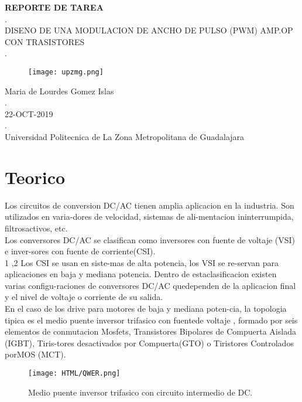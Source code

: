 \documentclass[11pt,a4paper]{article}
\author{Maria de Lourdes Gomez}
\begin{document}
\begin{center}
\textbf{REPORTE DE TAREA}\\
.\\
DISENO DE UNA MODULACION DE ANCHO DE PULSO (PWM) AMP.OP CON TRASISTORES\\
.
\end{center}

\begin{figure}[h]
\centering
\texttt{[image: upzmg.png]} 
\end{figure}

\begin{center}
Maria de Lourdes Gomez Islas\\
.\\
22-OCT-2019\\
.\\
Universidad Politecnica de La Zona Metropolitana de Guadalajara
\end{center}

\newpage 

\part{Teorico}

Los circuitos de conversion DC/AC tienen amplia aplicacion en la industria.  Son  utilizados  en  varia-dores de velocidad, sistemas de ali-mentacion  ininterrumpida,  filtrosactivos,  etc.\\
Los  conversores  DC/AC  se  clasifican  como  inversores con fuente de voltaje (VSI) e inver-sores  con  fuente  de  corriente(CSI).\\
1 ,2 Los CSI se usan en siste-mas de alta potencia, los VSI se re-servan para aplicaciones en baja y mediana  potencia.  Dentro  de  estaclasificacion existen varias configu-raciones de conversores DC/AC quedependen de la aplicacion final y el nivel  de  voltaje  o  corriente  de  su salida.\\
En el caso de los drive para motores  de  baja  y  mediana  poten-cia, la topologia tipica es el medio puente inversor trifasico con fuentede voltaje , formado por seis  elementos  de  conmutacion Mosfets, Transistores Bipolares de Compuerta Aislada (IGBT), Tiris-tores  desactivados  por  Compuerta(GTO) o Tiristores Controlados porMOS (MCT).

\begin{figure}[h]
\centering
\texttt{[image: HTML/QWER.png]}  
\caption{Medio puente inversor trifasico con circuito intermedio de DC.}
\end{figure}
\end{document}
